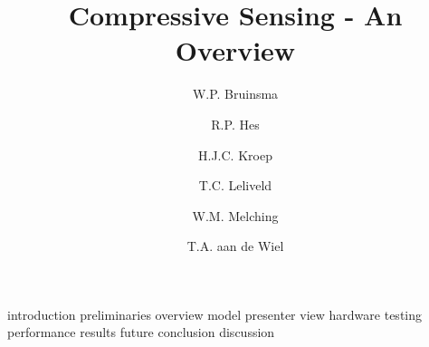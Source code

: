 \documentclass[a4paper, openany, oneside]{memoir}
\title{Compressive Sensing - An Overview}
\author{W.P. Bruinsma \and R.P. Hes \and H.J.C. Kroep \and T.C. Leliveld \and W.M. Melching \and T.A. aan de Wiel}
\begin{document}
{introduction}
{preliminaries}
{overview}
{model}
{presenter}
{view}
{hardware}
{testing}
{performance}
{results}
{future}
{conclusion}
{discussion}
\end{document}
